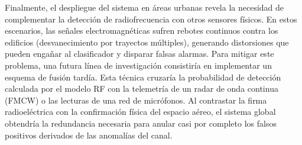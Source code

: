 Finalmente, el despliegue del sistema en áreas urbanas revela la necesidad de complementar la detección de radiofrecuencia con otros sensores físicos. En estos escenarios, las señales electromagnéticas sufren rebotes continuos contra los edificios (desvanecimiento por trayectos múltiples), generando distorsiones que pueden engañar al clasificador y disparar falsas alarmas. Para mitigar este problema, una futura línea de investigación consistiría en implementar un esquema de fusión tardía. Esta técnica cruzaría la probabilidad de detección calculada por el modelo RF con la telemetría de un radar de onda continua (FMCW) o las lecturas de una red de micrófonos. Al contrastar la firma radioeléctrica con la confirmación física del espacio aéreo, el sistema global obtendría la redundancia necesaria para anular casi por completo los falsos positivos derivados de las anomalías del canal.
